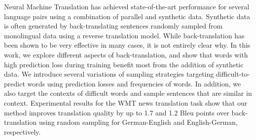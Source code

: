 Neural Machine Translation has achieved state-of-the-art performance for several language pairs using a combination of parallel and synthetic data. Synthetic data is often generated by back-translating sentences randomly sampled from monolingual data using a reverse translation model. While back-translation has been shown to be very effective in many cases, it is not entirely clear why. In this work, we explore different aspects of back-translation, and show that words with high prediction loss during training benefit most from the addition of synthetic data. We introduce several variations of sampling strategies targeting difficult-to-predict words using prediction losses and frequencies of words. In addition, we also target the contexts of difficult words and sample sentences that are similar in context. Experimental results for the WMT news translation task show that our method improves translation quality by up to 1.7 and 1.2 Bleu points over back-translation using random sampling for German-English and English-German, respectively.
